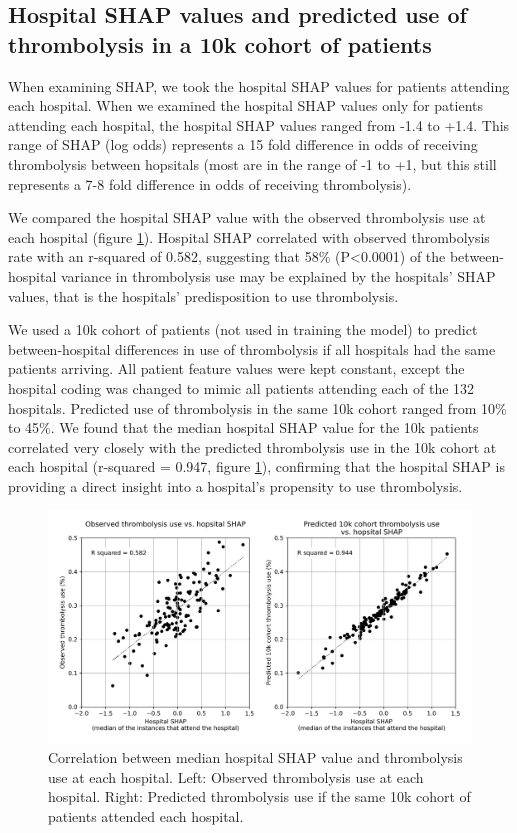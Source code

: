 
\subsection{Hospital SHAP values and predicted use of thrombolysis in a 10k cohort of patients}

When examining SHAP, we took the hospital SHAP values for patients attending each hospital. When we examined the hospital SHAP values only for patients attending each hospital, the hospital SHAP values ranged from -1.4 to +1.4. This range of SHAP (log odds) represents a 15 fold difference in odds of receiving thrombolysis between hopsitals (most are in the range of -1 to +1, but this still represents a 7-8 fold difference in odds of receiving thrombolysis).

We compared the hospital SHAP value with the observed thrombolysis use at each hospital (figure \ref{fig:results_correlation}). Hospital SHAP correlated with observed thrombolysis rate with an r-squared of 0.582, suggesting that 58\% (P<0.0001) of the between-hospital variance in thrombolysis use may be explained by the hospitals' SHAP values, that is the hospitals' predisposition to use thrombolysis.

We used a 10k cohort of patients (not used in training the model) to predict between-hospital differences in use of thrombolysis if all hospitals had the same patients arriving. All patient feature values were kept constant, except the hospital coding was changed to mimic all patients attending each of the 132 hospitals. Predicted use of thrombolysis in the same 10k cohort ranged from 10\% to 45\%. We found that the median hospital SHAP value for the 10k patients correlated very closely with the predicted thrombolysis use in the 10k cohort at each hospital (r-squared = 0.947, figure \ref{fig:results_correlation}), confirming that the hospital SHAP is providing a direct insight into a hospital's propensity to use thrombolysis.

\begin{figure}
\centering
\includegraphics[width=1\textwidth]{./images/99_twin_correlation_scatter}
\caption{Correlation between median hospital SHAP value and thrombolysis use at each hospital. Left: Observed thrombolysis use at each hospital. Right: Predicted thrombolysis use if the same 10k cohort of patients attended each hospital.}
\label{fig:results_correlation}
\end{figure}

